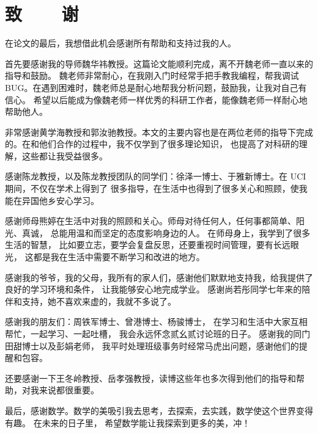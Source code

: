 ﻿\chapter*{致~~~~谢}
在论文的最后，我想借此机会感谢所有帮助和支持过我的人。

首先要感谢我的导师{魏华祎}教授。这篇论文能顺利完成，离不开魏老师一直以来的指导和鼓励。
魏老师非常耐心，在我刚入门时经常手把手教我编程，帮我调试
BUG。在遇到困难时，魏老师总是耐心地帮我分析问题，鼓励我，让我对自己有信心。
希望以后能成为像魏老师一样优秀的科研工作者，能像魏老师一样耐心地帮助他人。

非常感谢黄学海教授和郭汝驰教授。本文的主要内容也是在两位老师的指导下完成的。在和他们合作的过程中，我不仅学到了很多理论知识，
也提高了对科研的理解，这些都让我受益很多。

感谢陈龙教授，以及陈龙教授团队的同学们：徐泽一博士、于雅新博士。在 UCI
期间，不仅在学术上得到了
很多指导，在生活中也得到了很多关心和照顾，使我能在异国他乡安心学习。

感谢师母熊婷在生活中对我的照顾和关心。师母对待任何人，任何事都简单、阳光、真诚，
总能用温和而坚定的态度影响身边的人。
在师母身上，我学到了很多生活的智慧，
比如要立志，要学会复盘反思，还要重视时间管理，要有长远眼光，
这都是我在生活中需要不断学习和改进的地方。

感谢我的爷爷，我的父母，我所有的家人们，感谢他们默默地支持我，给我提供了良好的学习环境和条件，
让我能够安心地完成学业。
感谢尚若彤同学七年来的陪伴和支持，她不喜欢来虚的，我就不多说了。

感谢我的朋友们：周铁军博士、曾港博士、杨骏博士，
在学习和生活中大家互相帮忙，一起学习、一起吐槽，
我会永远怀念贰幺贰讨论班的日子。
感谢我的同门田甜博士以及彭娟老师，
我平时处理班级事务时经常马虎出问题，感谢他们的提醒和包容。

还要感谢一下王冬岭教授、岳孝强教授，读博这些年也多次得到他们的指导和帮助，对我来说都很重要。 

最后，感谢数学。数学的美吸引我去思考，去探索，去实践，数学使这个世界变得有趣。
在未来的日子里，
希望数学能让我探索到更多的美，冲！






